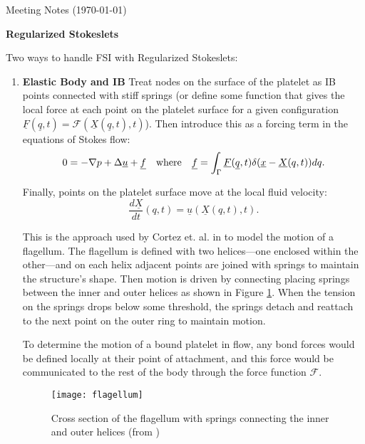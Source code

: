 \documentclass{article}
\newcommand{\tn}{\textnormal}
\begin{document}
\pagestyle{plain}

\begin{center}
  {\Large Meeting Notes (\today)}
\end{center}

\large{\textbf{Regularized Stokeslets}}

Two ways to handle FSI with Regularized Stokeslets:
\begin{enumerate}
\item \textbf{Elastic Body and IB} Treat nodes on the surface of the
  platelet as IB points connected with stiff springs (or define some
  function that gives the local force at each point on the platelet
  surface for a given configuration
  $\underline{F}(\underline{q},t) =
  \mathcal{F}(\underline{X}(\underline{q}, t), t)$). Then introduce
  this as a forcing term in the equations of Stokes flow:
  $$0 = -\nabla p + \Delta \underline{u} + \underline{f} \quad
  \tn{where} \quad \underline{f} = \int_\Gamma
  \underline{F}(\underline{q}, t) \delta(\underline{x} -
  \underline{X}(q, t)) dq.$$

  Finally, points on the platelet surface move at the local fluid
  velocity:
  $$\frac{d\underline{X}}{dt}(q, t) =
  \underline{u}(\underline{X}(q,t), t).$$

  This is the approach used by Cortez et. al. in \cite{Cortez2005} to
  model the motion of a flagellum. The flagellum is defined with two
  helices---one enclosed within the other---and on each helix adjacent
  points are joined with springs to maintain the structure's
  shape. Then motion is driven by connecting placing springs between
  the inner and outer helices as shown in Figure
  \ref{fig:flagellum}. When the tension on the springs drops below
  some threshold, the springs detach and reattach to the next point on
  the outer ring to maintain motion.

  To determine the motion of a bound platelet in flow, any bond forces
  would be defined locally at their point of attachment, and this
  force would be communicated to the rest of the body through the
  force function $\mathcal{F}$.

  \begin{figure}[h]
    \centering
    \texttt{[image: flagellum]}
    \caption{Cross section of the flagellum with springs connecting
      the inner and outer helices (from \cite{Cortez2005})}
    \label{fig:flagellum}
  \end{figure}
  

\end{enumerate}
\end{document}
